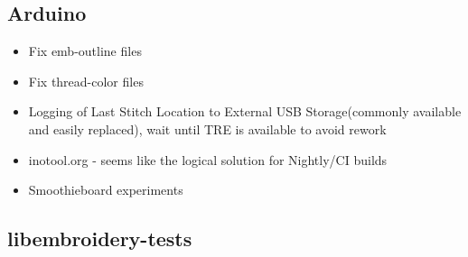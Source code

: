\documentclass[a4paper]{report}
\begin{document}
\subsection{Arduino}

\begin{itemize}
\item Fix emb-outline files
\item Fix thread-color files
\item Logging of Last Stitch Location to External USB Storage(commonly available and easily replaced), wait until TRE is available to avoid rework
\item inotool.org - seems like the logical solution for Nightly/CI builds
\item Smoothieboard experiments
\end{itemize}

\subsection{libembroidery-tests}
\end{document}
